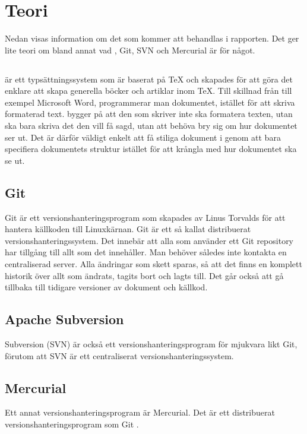 \section{Teori}
\label{sec:theory-tuhkala}
Nedan visas information om det som kommer att behandlas i rapporten. Det ger lite teori om bland annat vad \latex, Git, SVN och Mercurial är för något.

\subsection{\latex}
\latex \cite{latex_project}\cite{latex_wiki} är ett typsättningssystem som är baserat på TeX och skapades för att göra det enklare att skapa generella böcker och artiklar inom TeX. Till skillnad från till exempel Microsoft Word, programmerar man dokumentet, istället för att skriva formaterad text. \latex bygger på att den som skriver inte ska formatera texten, utan ska bara skriva det den vill få sagd, utan att behöva bry sig om hur dokumentet ser ut. Det är därför väldigt enkelt att få stiliga dokument i \latex genom att bara specifiera dokumentets struktur istället för att krångla med hur dokumentet ska se ut.

\subsection{Git}
Git \cite{git_history}\cite{git} är ett versionshanteringsprogram som skapades av Linus Torvalds för att hantera källkoden till Linuxkärnan. Git är ett så kallat distribuerat versionshanteringssystem. Det innebär att alla som använder ett Git repository har tillgång till allt som det innehåller. Man behöver således inte kontakta en centraliserad server. Alla ändringar som skett sparas, så att det finns en komplett historik över allt som ändrats, tagits bort och lagts till. Det går också att gå tillbaka till tidigare versioner av dokument och källkod.

\subsection{Apache Subversion}
Subversion (SVN) \cite{svn} är också ett versionshanteringsprogram för mjukvara likt Git, förutom att SVN är ett centraliserat versionshanteringssystem.

\subsection{Mercurial}
Ett annat versionshanteringsprogram är Mercurial. Det är ett distribuerat versionshanteringsprogram som Git \cite{mercurial}.

